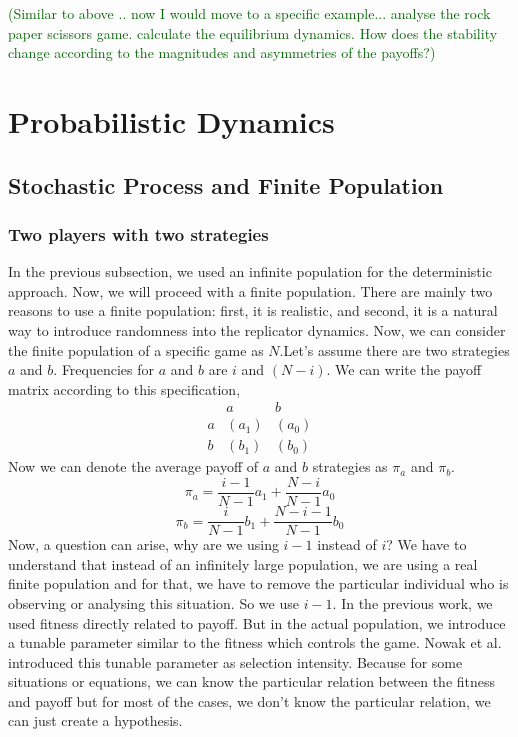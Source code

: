 \documentclass{article}
\newcommand{\cha}[1]{\textcolor{darkgreen}{(#1)}}
\begin{document}
\cha{Similar to above .. now I would move to a specific example... analyse the rock paper scissors game. calculate the equilibrium dynamics. How does the stability change according to the magnitudes and asymmetries of the payoffs?}


\section{Probabilistic Dynamics}
\subsection{Stochastic Process and Finite Population}
\subsubsection{Two players with two strategies}
In the previous subsection, we used an infinite population for the deterministic approach\cite{Hofbauer2003}. Now, we will proceed with a finite population. There are mainly two reasons to use a finite population: first, it is realistic, and second, it is a natural way to introduce randomness into the replicator dynamics\cite{Altrock2010}.
Now, we can consider the finite population of a specific game as $N$.Let's assume there are two strategies $a$ and $b$. Frequencies for $a$ and $b$ are $i$ and $(N-i)$. We can write the payoff matrix according to this specification,
\[
\begin{array}{c|cc}
    & a & b \\
    \hline
  a & (a_1) & (a_0) \\
  b & (b_1) & (b_0)
\end{array}
\]
Now we can denote the average payoff of $a$ and $b$ strategies as $\pi_a$ and $\pi_b$.
\[\pi_a=\frac{i-1}{N-1}a_1 + \frac{N-i}{N-1}a_0\]
\[\pi_b=\frac {i}{N-1}b_1 + \frac{N-i-1}{N-1}b_0\]
Now, a question can arise, why are we using $i-1$ instead of $i$? We have to understand that instead of an infinitely large population, we are using a real finite population and for that, we have to remove the particular individual who is observing or analysing this situation. So we use $i-1$.
In the previous work, we used fitness directly related to payoff. But in the actual population, we introduce a tunable parameter similar to the fitness which controls the game.
Nowak et al.\cite{Nowak2004} introduced this tunable parameter as selection intensity. Because for some situations or equations, we can know the particular relation between the fitness and payoff but for most of the cases, we don't know the particular relation, we can just create a hypothesis.
\end{document}
